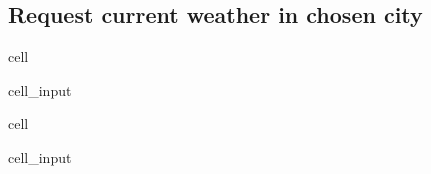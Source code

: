 \documentclass[letterpaper,10pt,english]{jupyterBook}
\begin{document}
\subsection{Request current weather in chosen city}
\label{\detokenize{2_Data_sources/APIs/OpenWeather:request-current-weather-in-chosen-city}}
\begin{sphinxuseclass}{cell}\begin{sphinxVerbatimInput}

\begin{sphinxuseclass}{cell_input}
\begin{sphinxVerbatim}[commandchars=\\\{\}]
  
\end{sphinxVerbatim}

\end{sphinxuseclass}\end{sphinxVerbatimInput}

\end{sphinxuseclass}
\begin{sphinxuseclass}{cell}\begin{sphinxVerbatimInput}

\begin{sphinxuseclass}{cell_input}
\begin{sphinxVerbatim}[commandchars=\\\{\}]
    
      
\end{sphinxVerbatim}

\end{sphinxuseclass}\end{sphinxVerbatimInput}

\end{sphinxuseclass}
\end{document}
